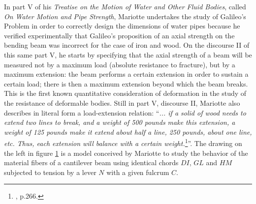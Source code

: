 In part V of his \emph{Treatise on the Motion of Water and Other Fluid Bodies}, called \emph{On Water Motion and Pipe Strength}, Mariotte undertakes the study of Galileo's Problem in order to correctly design the dimensions of water pipes because he verified experimentally that Galileo's proposition of an axial strength on the bending beam was incorrect for the case of iron and wood. On the discourse II of this same part V, he starts by specifying that the axial strength of a beam will be measured not by a maximum load (absolute resistance to fracture), but by a maximum extension: the beam performs a certain extension in order to sustain a certain load; there is then a maximum extension beyond which the beam breaks. This is the first known quantitative consideration of deformation in the study of the resistance of deformable bodies. Still in part V, discourse II, Mariotte also describes in literal form a load-extension relation: ``\emph{... if a solid of wood needs to extend two lines to break, and a weight of 500 pounds make this extension, a weight of 125 pounds make it extend about half a line, 250 pounds, about one line, etc. Thus, each extension will balance with a certain weight.}\footnote{\cite{benvenuto_1991}, p.266.}''. The drawing on the left in figure \ref{fg:mariotte} is a model conceived by Mariotte to study the behavior of the material fibers of a cantilever beam using identical chords $DI$, $GL$ and $HM$ subjected to tension by a lever $N$ with a given fulcrum $C$.     
\begin{figure}[!ht]
	\centering
	\begin{center}
	\end{center}
	\label{fg:mariotte}
\end{figure}
